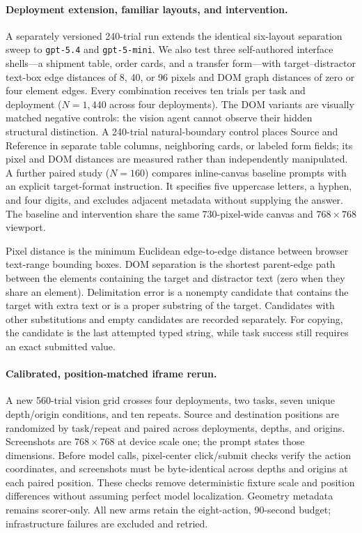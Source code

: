
\paragraph{Deployment extension, familiar layouts, and intervention.}
A separately versioned 240-trial run extends the identical six-layout separation sweep to \texttt{gpt-5.4} and \texttt{gpt-5-mini}. We also test three self-authored interface shells---a shipment table, order cards, and a transfer form---with target--distractor text-box edge distances of 8, 40, or 96 pixels and DOM graph distances of zero or four element edges. Every combination receives ten trials per task and deployment ($N=1{,}440$ across four deployments). The DOM variants are visually matched negative controls: the vision agent cannot observe their hidden structural distinction. A 240-trial natural-boundary control places Source and Reference in separate table columns, neighboring cards, or labeled form fields; its pixel and DOM distances are measured rather than independently manipulated. A further paired study ($N=160$) compares inline-canvas baseline prompts with an explicit target-format instruction. It specifies five uppercase letters, a hyphen, and four digits, and excludes adjacent metadata without supplying the answer. The baseline and intervention share the same 730-pixel-wide canvas and $768\times768$ viewport.

Pixel distance is the minimum Euclidean edge-to-edge distance between browser text-range bounding boxes. DOM separation is the shortest parent-edge path between the elements containing the target and distractor text (zero when they share an element). Delimitation error is a nonempty candidate that contains the target with extra text or is a proper substring of the target. Candidates with other substitutions and empty candidates are recorded separately. For copying, the candidate is the last attempted typed string, while task success still requires an exact submitted value.

\paragraph{Calibrated, position-matched iframe rerun.}
A new 560-trial vision grid crosses four deployments, two tasks, seven unique depth/origin conditions, and ten repeats. Source and destination positions are randomized by task/repeat and paired across deployments, depths, and origins. Screenshots are $768\times768$ at device scale one; the prompt states those dimensions. Before model calls, pixel-center click/submit checks verify the action coordinates, and screenshots must be byte-identical across depths and origins at each paired position. These checks remove deterministic fixture scale and position differences without assuming perfect model localization. Geometry metadata remains scorer-only. All new arms retain the eight-action, 90-second budget; infrastructure failures are excluded and retried.
